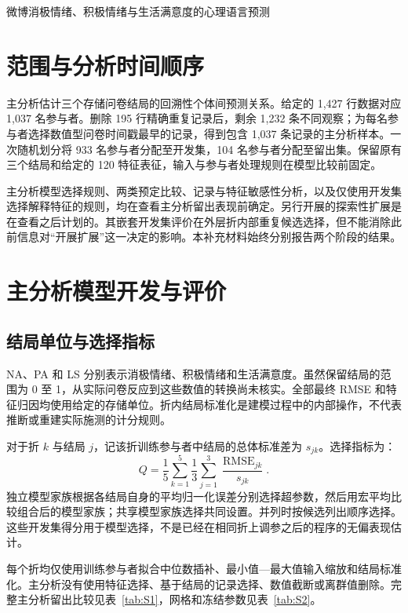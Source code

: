
\renewcommand{\thetable}{S\arabic{table}}

\begin{center}微博消极情绪、积极情绪与生活满意度的心理语言预测\end{center}
\section{范围与分析时间顺序}
主分析估计三个存储问卷结局的回溯性个体间预测关系。给定的 1,427 行数据对应 1,037 名参与者。删除 195 行精确重复记录后，剩余 1,232 条不同观察；为每名参与者选择数值型问卷时间戳最早的记录，得到包含 1,037 条记录的主分析样本。一次随机划分将 933 名参与者分配至开发集，104 名参与者分配至留出集。保留原有三个结局和给定的 120 特征表征，输入与参与者处理规则在模型比较前固定。

主分析模型选择规则、两类预定比较、记录与特征敏感性分析，以及仅使用开发集选择解释特征的规则，均在查看主分析留出表现前确定。另行开展的探索性扩展是在查看之后计划的。其嵌套开发集评价在外层折内部重复候选选择，但不能消除此前信息对“开展扩展”这一决定的影响。本补充材料始终分别报告两个阶段的结果。

\section{主分析模型开发与评价}
\subsection{结局单位与选择指标}
NA、PA 和 LS 分别表示消极情绪、积极情绪和生活满意度。虽然保留结局的范围为 0 至 1，从实际问卷反应到这些数值的转换尚未核实。全部最终 RMSE 和特征归因均使用给定的存储单位。折内结局标准化是建模过程中的内部操作，不代表推断或重建实际施测的计分规则。

对于折 $k$ 与结局 $j$，记该折训练参与者中结局的总体标准差为 $s_{jk}$。选择指标为：
\[
Q=\frac{1}{5}\sum_{k=1}^{5}\frac{1}{3}\sum_{j=1}^{3}
\frac{\operatorname{RMSE}_{jk}}{s_{jk}}.
\]
独立模型家族根据各结局自身的平均归一化误差分别选择超参数，然后用宏平均比较组合后的模型家族；共享模型家族选择共同设置。并列时按候选列出顺序选择。这些开发集得分用于模型选择，不是已经在相同折上调参之后的程序的无偏表现估计。

每个折均仅使用训练参与者拟合中位数插补、最小值—最大值输入缩放和结局标准化。主分析没有使用特征选择、基于结局的记录选择、数值截断或离群值删除。完整主分析留出比较见表~\ref{tab:S1}，网格和冻结参数见表~\ref{tab:S2}。

